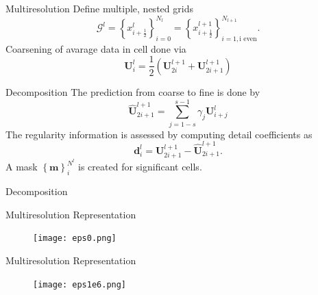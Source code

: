\documentclass{beamer}
\begin{document}
\begin{frame}{Multiresolution}
    Define multiple, nested grids
    \begin{equation*}
        \mathcal{G}^{l} = \left\{ x^{l}_{i+\frac{1}{2}} \right\}_{i=0}^{N_{l}} =
            \left\{ x^{l+1}_{i+\frac{1}{2}} \right\}_{i=1,\text{i even}}^{N_{l+1}}.
    \end{equation*}
    Coarsening of avarage data in cell done via
    \begin{equation*}
        \mathbf{U}^{l}_{i} = \frac{1}{2} \left( \mathbf{U}^{l+1}_{2i} + \mathbf{U}^{l+1}_{2i+1} \right)
    \end{equation*}
\end{frame}

\begin{frame}{Decomposition}
    The prediction from coarse to fine is done by
    \begin{equation*}
        \mathbf{\hat{U}}^{l+1}_{2i+1} = \sum_{j=1-s}^{s-1} \gamma_{j} \mathbf{U}^{l}_{i+j}
    \end{equation*}
    The regularity information is assessed by computing detail coefficients as
    \begin{equation*}
        \mathbf{d}^{l}_{i} = \mathbf{U}^{l+1}_{2i+1} - \mathbf{\hat{U}}^{l+1}_{2i+1}.
    \end{equation*}
    A mask $\left\{ \mathbf{m} \right\}_{i}^{N^{l}}$ is created for significant cells.
\end{frame}

\begin{frame}[shrink=25]{Decomposition}
    \vspace{1.5cm}
    \begin{figure}
        \center
        
    \end{figure}
\end{frame}

\begin{frame}{Multiresolution Representation}
    \begin{figure}
        \center
        \texttt{[image: eps0.png]}
    \end{figure}
\end{frame}

\begin{frame}{Multiresolution Representation}
    \begin{figure}
        \center
        \texttt{[image: eps1e6.png]}
    \end{figure}
\end{frame}
\end{document}

